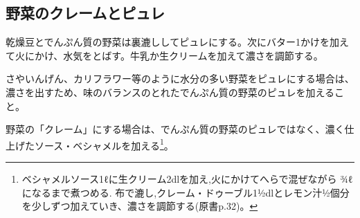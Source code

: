 \hypertarget{cremes-et-puree-de-legumes}{%
\subsection{野菜のクレームとピュレ}\label{cremes-et-puree-de-legumes}}

乾燥豆とでんぷん質の野菜は裏漉ししてピュレにする。次にバター1かけを加えて火にかけ、水気をとばす。牛乳か生クリームを加えて濃さを調節する。

さやいんげん、カリフラワー等のように水分の多い野菜をピュレにする場合は、濃さを出すため、味のバランスのとれたでんぷん質の野菜のピュレを加えること。

野菜の「クレーム」にする場合は、でんぷん質の野菜のピュレではなく、濃く仕上げたソース・ベシャメルを加える\footnote{ベシャメルソース1ℓに生クリーム2dlを加え,火にかけてへらで混ぜながら
  ¾ℓになるまで煮つめる.
  布で漉し,クレーム・ドゥーブル1½dlとレモン汁½個分を少しずつ加えていき、濃さを調節する(原書p.32)。}。
